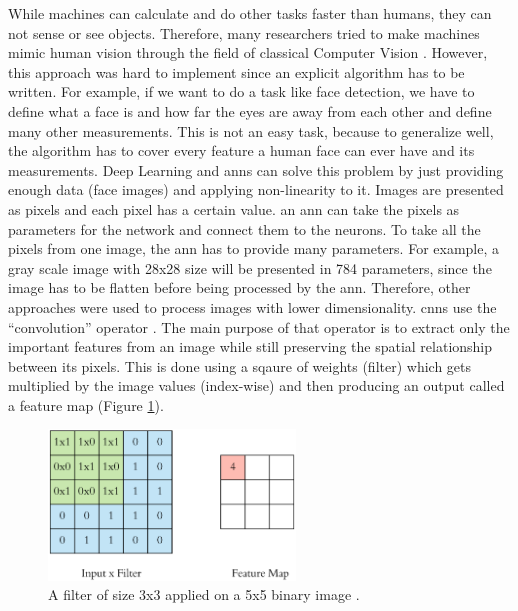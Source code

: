 \documentclass[runningheads]{llncs}
\begin{document}
While machines can calculate and do other tasks faster than humans,
they can not sense or see objects. Therefore, many researchers
tried to make machines mimic human vision through the field of classical Computer Vision \cite{hoffmann1992computer}.
However, this approach was hard to implement since an explicit algorithm 
has to be written. For example, if we want to do a task like
face detection, we have to define what a face is and how
far the eyes are away from each other and define many other measurements. This is not 
an easy task, because to generalize well, the algorithm has to 
cover every feature a human face can ever have and its measurements. Deep Learning 
and \gls{anns} can solve this problem by just providing enough data
(face images) and applying non-linearity to it.
Images are presented as pixels and each pixel has a certain value.
an \gls{ann} can take the pixels as parameters for the network 
and connect them to the neurons. To take all the pixels from
one image, the \gls{ann} has to provide many parameters. For example,
a gray scale image with 28x28 size will be presented in 784 parameters, 
since the image has to be flatten before being processed by the \gls{ann}.
Therefore, other approaches were used to process images with lower dimensionality.
\gls{cnns} use the “convolution” operator \cite{lecun1998gradient}. The main purpose of that 
operator is to extract only the important features from an image while
still preserving the spatial relationship between its pixels. This is 
done using a sqaure of weights (filter) which
gets multiplied by the image values (index-wise) and then producing an output called a feature map (Figure \ref{fm}).


\begin{figure}[H]
    \label{fm}
    \centering
    \includegraphics[height=4cm]{filter}
    \caption{A filter of size 3x3 applied on a 5x5 binary image \cite{appf}.}
\end{figure}
\end{document}
